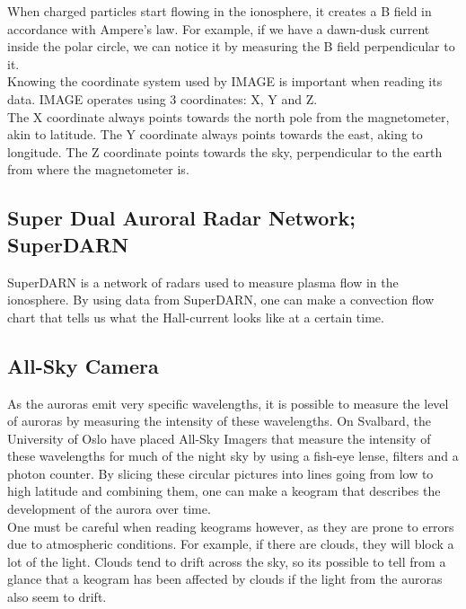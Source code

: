 \documentclass[norsk,a4paper,11pt]{article}
\begin{document}
\begin{multicols}{2}
When charged particles start flowing in the ionosphere, it creates a B field in accordance with Ampere's law. For example, if we have a dawn-dusk current inside the polar circle, we can notice it by measuring the B field perpendicular to it.\\
Knowing the coordinate system used by IMAGE is important when reading its data. IMAGE operates using 3 coordinates: X, Y and Z.\\
The X coordinate always points towards the north pole from the magnetometer, akin to latitude. The Y coordinate always points towards the east, aking to longitude. The Z coordinate points towards the sky, perpendicular to the earth from where the magnetometer is.

\subsection{Super Dual Auroral Radar Network; SuperDARN}
SuperDARN is a network of radars used to measure plasma flow in the ionosphere. By using data from SuperDARN, one can make a convection flow chart that tells us what the Hall-current looks like at a certain time.

\subsection{All-Sky Camera}
As the auroras emit very specific wavelengths, it is possible to measure the level of auroras by measuring the intensity of these wavelengths. On Svalbard, the University of Oslo have placed All-Sky Imagers that measure the intensity of these wavelengths for much of the night sky by using a fish-eye lense, filters and a photon counter. By slicing these circular pictures into lines going from low to high latitude and combining them, one can make a keogram that describes the development of the aurora over time.\\
One must be careful when reading keograms however, as they are prone to errors due to atmospheric conditions. For example, if there are clouds, they will block a lot of the light. Clouds tend to drift across the sky, so its possible to tell from a glance that a keogram has been affected by clouds if the light from the auroras also seem to drift.


\end{multicols}
\end{document}
